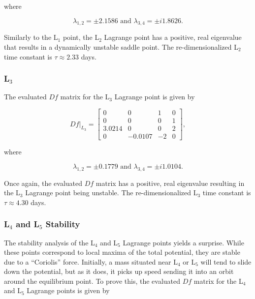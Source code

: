 \documentclass[11pt]{article} %
\begin{document}
\noindent
where

\begin{equation}
	\label{e:evals_L2}
	\lambda_{1,2} = \pm 2.1586 \text{ and } \lambda_{3,4} = \pm i1.8626.
\end{equation}

\noindent
Similarly to the L$_1$ point, the L$_2$ Lagrange point has a positive, real eigenvalue that results in a dynamically unstable saddle point. The re-dimensionalized L$_2$ time constant is $\tau\approx2.33$ days. 

\subsubsection*{L$_3$}
The evaluated $Df$ matrix for the L$_3$ Lagrange point is given by

\doublespacing
\begin{equation}
	\label{e:df_eval_L3}
	Df|_{L_3} = 
	\begin{bmatrix} 
		0 & 0 & 1  & 0 \\ 
		0 & 0 & 0 & 1 \\
		3.0214 & 0 & 0 & 2 \\
		0 & -0.0107 & -2 & 0
	\end{bmatrix},
\end{equation}
\singlespacing

\noindent
where

\begin{equation}
	\label{e:evals_L3}
	\lambda_{1,2} = \pm 0.1779 \text{ and } \lambda_{3,4} = \pm i1.0104.
\end{equation}

\noindent
Once again, the evaluated $Df$ matrix has a positive, real eigenvalue resulting in the L$_3$ Lagrange point being unstable. The re-dimensionalized L$_3$ time constant is $\tau\approx4.30$ days.

\subsubsection{L$_4$ and L$_5$ Stability}
The stability analysis of the L$_4$ and L$_5$ Lagrange points yields a surprise. While these points correspond to local maxima of the total potential, they are stable due to a ``Coriolis'' force. Initially, a mass situated near L$_4$ or L$_5$ will tend to slide down the potential, but as it does, it picks up speed sending it into an orbit around the equilibrium point. To prove this, the evaluated $Df$ matrix for the L$_4$ and L$_5$ Lagrange points is given by
\end{document}
